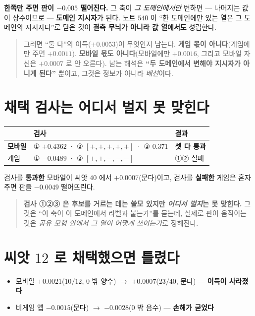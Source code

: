 \documentclass[11pt]{article}
\begin{document}
\textbf{한쪽만 주면 판이 $-0.005$ 떨어진다.} 그 축이 \emph{그 도메인에서만}
변하면 --- 나머지는 값이 상수이므로 --- \textbf{도메인 지시자}가 된다.
노트 $540$ 이 ``한 도메인에만 있는 열은 그 도메인의 지시자다''로 닫은 것이
\textbf{결측 무늬가 아니라 값 열에서도} 성립한다.

\begin{quote}
그러면 ``둘 다''의 이득($+0.0053$)이 무엇인지 남는다. \textbf{게임 몫이
아니다}(게임에만 주면 $+0.0011$). \textbf{모바일 몫도 아니다}(모바일에만
$+0.0016$, 그리고 모바일 자신은 $+0.0007$ 로 안 오른다). 남는 해석은
\textbf{``두 도메인에서 변해야 지시자가 아니게 된다''} 뿐이고, 그것은 정보가
아니라 \emph{배선}이다.
\end{quote}

\section{채택 검사는 어디서 벌지 못 맞힌다}

\begin{center}
\begin{tabular}{lll}
\hline
 & 검사 & 결과 \\
\hline
\textbf{모바일} & ① $+0.4362$ · ② $[+,+,+,+,+]$ · ③ $0.371$ & \textbf{셋 다 통과} \\
게임 & ① $-0.0489$ · ② $[+,+,-,-,-]$ & ①② 실패 \\
\hline
\end{tabular}
\end{center}

검사를 \textbf{통과한} 모바일이 씨앗 $40$ 에서 $+0.0007$(문다)이고, 검사를
\textbf{실패한} 게임은 혼자 주면 판을 $-0.0049$ 떨어뜨린다.

\begin{quote}
\textbf{검사 ①②③ 은 후보를 거르는 데는 쓸모 있지만 \emph{어디서 벌지}는
못 맞힌다.} 그것은 ``이 축이 이 도메인에서 라벨과 붙는가''를 묻는데,
실제로 판이 움직이는 것은 \emph{공유 모형 안에서 그 열이 어떻게 쓰이는가}로
정해진다.
\end{quote}

\section{씨앗 $12$ 로 채택했으면 틀렸다}

\begin{itemize}
\item 모바일 $+0.0021$($10/12$, $0$ 밖 양수) $\to$ $+0.0007$($23/40$, 문다)
--- \textbf{이득이 사라졌다}
\item 비게임 앱 $-0.0015$(문다) $\to$ $-0.0028$($0$ 밖 음수) ---
\textbf{손해가 굳었다}
\end{itemize}
\end{document}
